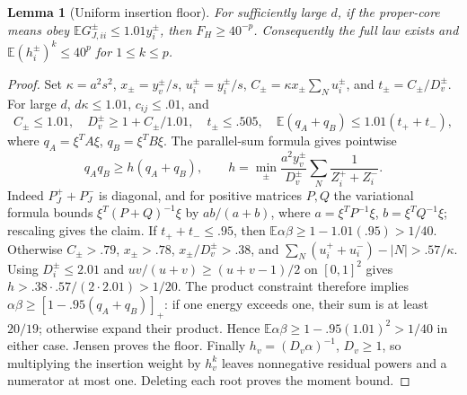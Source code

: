 \documentclass[10pt]{article}
\numberwithin{equation}{section}
\newtheorem{lemma}{Lemma}[section]
\newcommand{\1}{\mathbf1}
\begin{document}
\begin{lemma}[Uniform insertion floor]\label{lem:fw-floor}
For sufficiently large $d$, if the proper-core means obey
$\mathbb E G_{J,ii}^\pm\le1.01y_i^\pm$, then $F_H\ge40^{-p}$.
Consequently the full law exists and
$\mathbb E(h_i^\pm)^k\le40^p$ for $1\le k\le p$.
\end{lemma}
\begin{proof}
Set $\kappa=a^2s^2$, $x_\pm=y_v^\pm/s$, $u_i^\pm=y_i^\pm/s$,
$C_\pm=\kappa x_\pm\sum_Nu_i^\pm$, and $t_\pm=C_\pm/D_v^\pm$.
For large $d$, $d\kappa\le1.01$, $c_{ij}\le.01$, and
\[
 C_\pm\le1.01,\quad D_v^\pm\ge1+C_\pm/1.01,
 \quad t_\pm\le.505,\quad
 \mathbb E(q_A+q_B)\le1.01(t_++t_-),
\]
where $q_A=\xi^TA\xi$, $q_B=\xi^TB\xi$.
The parallel-sum formula gives pointwise
\[
 q_Aq_B\ge h(q_A+q_B),\qquad
 h=\min_\pm\frac{a^2y_v^\pm}{D_v^\pm}
                  \sum_N\frac1{Z_i^++Z_i^-}.
\]
Indeed $P_J^++P_J^-$ is diagonal, and for positive matrices $P,Q$
the variational formula bounds
$\xi^T(P+Q)^{-1}\xi$ by $ab/(a+b)$, where
$a=\xi^TP^{-1}\xi$, $b=\xi^TQ^{-1}\xi$; rescaling gives the claim.
If $t_++t_-\le.95$, then
$\mathbb E\alpha\beta\ge1-1.01(.95)>1/40$.
Otherwise $C_\pm>.79$, $x_\pm>.78$,
$x_\pm/D_v^\pm>.38$, and
$\sum_N(u_i^++u_i^-)-|N|>.57/\kappa$.
Using $D_i^\pm\le2.01$ and
$uv/(u+v)\ge(u+v-1)/2$ on $[0,1]^2$ gives
$h>.38\cdot.57/(2\cdot2.01)>1/20$.
The product constraint therefore implies
$\alpha\beta\ge[1-.95(q_A+q_B)]_+$:
if one energy exceeds one, their sum is at least $20/19$;
otherwise expand their product.
Hence $\mathbb E\alpha\beta\ge1-.95(1.01)^2>1/40$ in either case.
Jensen proves the floor. Finally $h_v=(D_v\alpha)^{-1}$,
$D_v\ge1$, so multiplying the insertion weight by $h_v^k$
leaves nonnegative residual powers and a numerator at most one.
Deleting each root proves the moment bound.
\end{proof}
\end{document}
